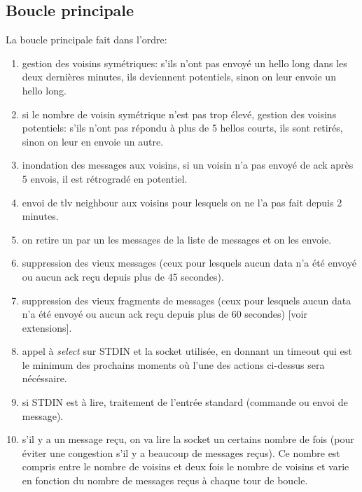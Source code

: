 \documentclass[a4paper,10pt]{article} %
\begin{document}
\subsection{Boucle principale}
La boucle principale fait dans l'ordre:
\begin{enumerate}
\item gestion des voisins symétriques: s'ils n'ont pas envoyé un hello long dans les deux dernières minutes, ils deviennent potentiels, sinon on leur envoie un hello long.
\item si le nombre de voisin symétrique n'est pas trop élevé, gestion des voisins potentiels: s'ils n'ont pas répondu à plus de 5 hellos courts, ils sont retirés, sinon on leur en envoie un autre.
\item inondation des messages aux voisins, si un voisin n'a pas envoyé de ack après 5 envois, il est rétrogradé en potentiel.
\item envoi de tlv neighbour aux voisins pour lesquels on ne l'a pas fait depuis 2 minutes.
\item on retire un par un les messages de la liste de messages et on les envoie.
\item suppression des vieux messages (ceux pour lesquels aucun data n'a été envoyé ou aucun ack reçu depuis plus de 45 secondes).
\item suppression des vieux fragments de messages (ceux pour lesquels aucun data n'a été envoyé ou aucun ack reçu depuis plus de 60 secondes) [voir extensions].
\item appel à \textit{select} sur STDIN et la socket utilisée, en donnant un timeout qui est le minimum des prochains moments où l'une des actions ci-dessus sera nécéssaire.
\item si STDIN est à lire, traitement de l'entrée standard (commande ou envoi de message).
\item s'il y a un message reçu, on va lire la socket un certains nombre de fois (pour éviter une congestion s'il y a beaucoup de messages reçus). Ce nombre est compris entre le nombre de voisins et deux fois le nombre de voisins et varie en fonction du nombre de messages reçus à chaque tour de boucle.
\end{enumerate}
\end{document}
